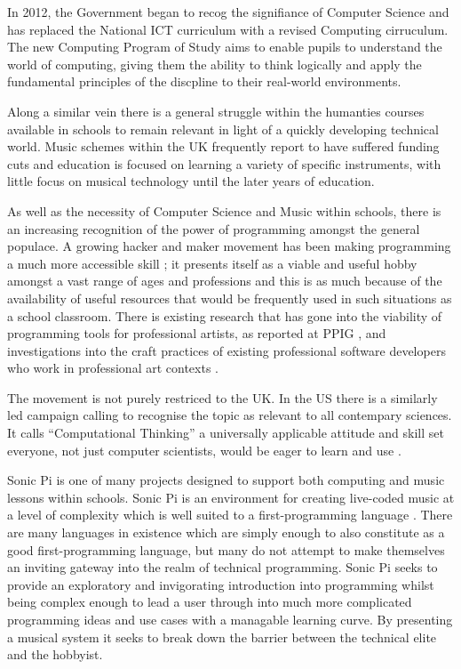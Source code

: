 \documentclass[11pt]{scrartcl}
\begin{document}
In 2012, the Government began to recog the signifiance of Computer Science and 
has replaced the National ICT curriculum with a revised Computing cirruculum. 
The new Computing Program of Study \cite{DfE13} aims to enable pupils to 
understand the world of computing, giving them the ability to think logically 
and apply the fundamental principles of the discpline to their real-world 
environments.

Along a similar vein there is a general struggle within the humanties courses 
available in schools to remain relevant in light of a quickly developing 
technical world. Music schemes within the UK frequently report to have 
suffered funding cuts and education is focused on learning a variety of 
specific instruments, with little focus on musical technology until the later 
years of education.

As well as the necessity of Computer Science and Music within schools, there 
is an increasing recognition of the power of programming amongst the general 
populace. A growing hacker and maker movement has been making programming a 
much more accessible skill \cite{BAD14}; it presents itself as a viable and 
useful hobby amongst a vast range of ages and professions and this is as much 
because of the availability of useful resources that would be frequently used 
in such situations as a school classroom. There is existing research that has 
gone into the viability of programming tools for professional artists, as 
reported at PPIG \cite{Ch12,BC05}, and investigations into the craft practices 
of existing professional software developers who work in professional art 
contexts \cite{W10}.

The movement is not purely restriced to the UK. In the US there is a similarly 
led campaign calling to recognise the topic as relevant to all contempary 
sciences. It calls ``Computational Thinking'' a universally applicable 
attitude and skill set everyone, not just computer scientists, would be eager 
to learn and use \cite{Wing06}.

Sonic Pi is one of many projects designed to support both computing and music 
lessons within schools. Sonic Pi is an environment for creating live-coded 
music at a level of complexity which is well suited to a first-programming 
language \cite{sp}. There are many languages in existence which are simply 
enough to also constitute as a good first-programming language, but many do 
not attempt to make themselves an inviting gateway into the realm of technical 
programming. Sonic Pi seeks to provide an exploratory and invigorating 
introduction into programming whilst being complex enough to lead a user 
through into much more complicated programming ideas and use cases with a 
managable learning curve. By presenting a musical system it seeks to break 
down the barrier between the technical elite and the hobbyist.
\end{document}
